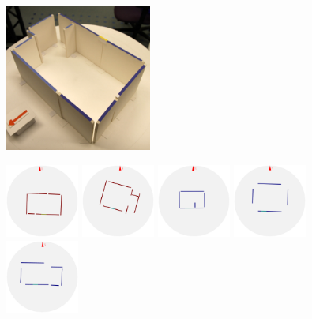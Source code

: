 \begin{figure}[t]
\begin{center}
\includegraphics[width=1.9in]{../gi2012_userstudy/images/photos/63_original} %
\begin{minipage}[b]{4.9in}
  \includegraphics[width=0.95in]{../gi2012_userstudy/images/section2/0_2D_walls_rotate} %
  \includegraphics[width=0.95in]{../gi2012_userstudy/images/section2/2_2D_walls_rotate} %
  \includegraphics[width=0.95in]{../gi2012_userstudy/images/section2/6_2D_walls_rotate}  %
  \includegraphics[width=0.95in]{../gi2012_userstudy/images/section2/7_2D_walls_rotate} %
  \includegraphics[width=0.95in]{../gi2012_userstudy/images/section2/8_2D_walls_rotate}\\ %

\end{minipage}
\end{center}
\end{figure}
